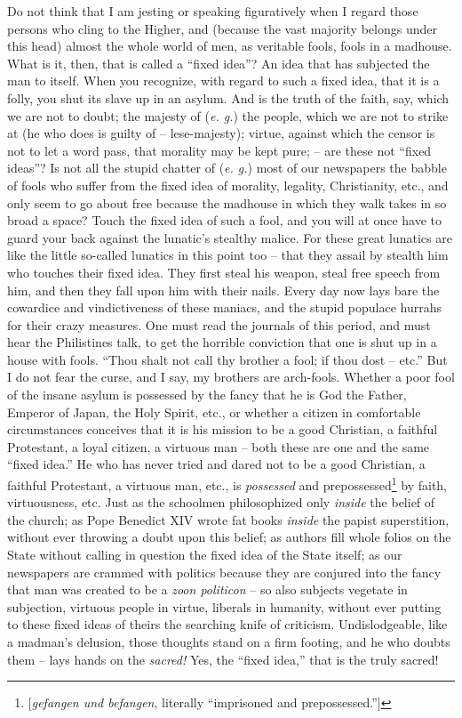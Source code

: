 \documentclass[12pt,a4paper]{book}
\begin{document}
Do not think that I am jesting or speaking figuratively when I regard those 
persons who cling to the Higher, and (because the vast majority belongs under 
this head) almost the whole world of men, as veritable fools, fools in a 
madhouse. What is it, then, that is called a ``fixed idea''? An idea that 
has subjected the man to itself. When you recognize, with regard to such a 
fixed idea, that it is a folly, you shut its slave up in an asylum. And is the 
truth of the faith, say, which we are not to doubt; the majesty of (\textit{e. 
g.}) the people, which we are not to strike at (he who does is guilty of -- 
lese-majesty); virtue, against which the censor is not to let a word pass, 
that morality may be kept pure; -- are these not ``fixed ideas''? Is not all 
the stupid chatter of (\textit{e. g.}) most of our newspapers the babble of 
fools who suffer from the fixed idea of morality, legality, Christianity, 
etc., and only seem to go about free because the madhouse in which they walk 
takes in so broad a space? Touch the fixed idea of such a fool, and you will 
at once have to guard your back against the lunatic's stealthy malice. For 
these great lunatics are like the little so-called lunatics in this point too 
-- that they assail by stealth him who touches their fixed idea. They first 
steal his weapon, steal free speech from him, and then they fall upon him with 
their nails. Every day now lays bare the cowardice and vindictiveness of these 
maniacs, and the stupid populace hurrahs for their crazy measures. One must 
read the journals of this period, and must hear the Philistines talk, to get 
the horrible conviction that one is shut up in a house with fools. ``Thou 
shalt not call thy brother a fool; if thou dost -- etc.'' But I do not fear 
the curse, and I say, my brothers are arch-fools. Whether a poor fool of the 
insane asylum is possessed by the fancy that he is God the Father, Emperor of 
Japan, the Holy Spirit, etc., or whether a citizen in comfortable 
circumstances conceives that it is his mission to be a good Christian, a 
faithful Protestant, a loyal citizen, a virtuous man -- both these are one and 
the same ``fixed idea.'' He who has never tried and dared not to be a good 
Christian, a faithful Protestant, a virtuous man, etc., is \textit{possessed} 
and prepossessed\footnote{[\textit{gefangen und befangen}, literally 
``imprisoned and prepossessed.'']} by faith, virtuousness, etc. Just as the 
schoolmen philosophized only \textit{inside} the belief of the church; as Pope 
Benedict XIV wrote fat books \textit{inside} the papist superstition, without 
ever throwing a doubt upon this belief; as authors fill whole folios on the 
State without calling in question the fixed idea of the State itself; as our 
newspapers are crammed with politics because they are conjured into the fancy 
that man was created to be a \textit{zoon politicon} -- so also subjects 
vegetate in subjection, virtuous people in virtue, liberals in humanity, 
without ever putting to these fixed ideas of theirs the searching knife of 
criticism. Undislodgeable, like a madman's delusion, those thoughts stand on a 
firm footing, and he who doubts them -- lays hands on the \textit{sacred!} 
Yes, the ``fixed idea,'' that is the truly sacred!
\end{document}
